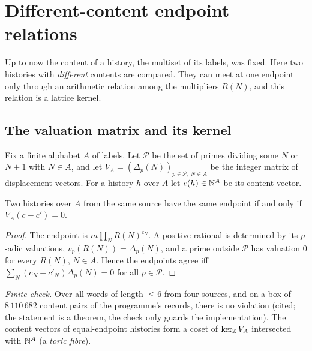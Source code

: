 \section{Different-content endpoint relations}\label{sec:endpoints}
Up to now the content of a history, the multiset of its labels, was fixed. Here two histories with \emph{different} contents are compared. They can meet at one endpoint only through an arithmetic relation among the multipliers $R(N)$, and this relation is a lattice kernel.

\subsection{The valuation matrix and its kernel}
Fix a finite alphabet $A$ of labels. Let $\mathcal P$ be the set of primes dividing some $N$ or $N+1$ with $N\in A$, and let $V_A=(\Delta_p(N))_{p\in\mathcal P,\,N\in A}$ be the integer matrix of displacement vectors. For a history $h$ over $A$ let $c(h)\in\mathbb N^A$ be its content vector.
\begin{theorem}\label{thm:kernel}
Two histories over $A$ from the same source have the same endpoint if and only if $V_A(c-c')=0$.
\end{theorem}
\begin{proof}
The endpoint is $m\prod_N R(N)^{c_N}$. A positive rational is determined by its $p$-adic valuations, $v_p(R(N))=\Delta_p(N)$, and a prime outside $\mathcal P$ has valuation $0$ for every $R(N)$, $N\in A$. Hence the endpoints agree iff $\sum_N(c_N-c'_N)\Delta_p(N)=0$ for all $p\in\mathcal P$.
\end{proof}
\emph{Finite check.} Over all words of length $\le6$ from four sources, and on a box of $8\,110\,682$ content pairs of the programme's records, there is no violation (cited; the statement is a theorem, the check only guards the implementation). The content vectors of equal-endpoint histories form a coset of $\ker_{\mathbb Z}V_A$ intersected with $\mathbb N^A$ (a \emph{toric fibre}).

